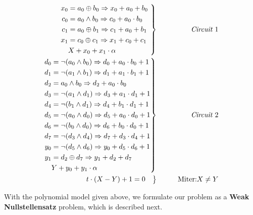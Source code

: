 \begin{Example}
\begin{eqnarray}%
 \left .  \begin{aligned}
	x_0&=a_0 \oplus b_0  \Rightarrow x_0+a_0 + b_0 \\
	c_0&=a_0\wedge b_0   \Rightarrow c_0+a_0 \cdot b_0\\
	c_1&=a_0\oplus b_1   \Rightarrow c_1+a_0 + b_1 \\
	x_{1}&=c_{0}\oplus c_{1}  \Rightarrow x_{1}+c_{0}+ c_{1} \\
	&X+x_{0}+x_{1}\cdot \alpha				\\
	 \end{aligned} 
\ \right\}
 &\qquad&  \text{\it Circuit $1$} \nonumber \\
 \left . \begin{aligned}
d_{0}&=\neg (a_{0} \wedge b_{0}) \Rightarrow d_{0}+ a_{0} \cdot b_{0}+1  \\
	d_{1}&=\neg (a_{1} \wedge b_{1}) \Rightarrow d_{1}+ a_{1} \cdot b_{1}+1  \\
	d_{2}&= a_{0} \wedge b_{0} \Rightarrow d_{2}+ a_{0}\cdot b_{0} \\
	d_{3}&=\neg (a_{1} \wedge d_{1}) \Rightarrow d_{3}+ a_{1} \cdot d_{1}+1  \\
	d_{4}&=\neg (b_{1} \wedge d_{1}) \Rightarrow d_{4}+ b_{1} \cdot d_{1}+1  \\
	d_{5}&=\neg (a_{0} \wedge d_{0}) \Rightarrow d_{5}+ a_{0} \cdot d_{0}+1  \\
	d_{6}&=\neg (b_{0} \wedge d_{0}) \Rightarrow d_{6}+ b_{0} \cdot d_{0}+1  \\
	d_{7}&=\neg (d_{3} \wedge d_{4}) \Rightarrow d_{7}+ d_{3} \cdot d_{4}+1  \\ 
	y_{0}&=\neg (d_{5} \wedge d_{6}) \Rightarrow y_{0}+ d_{5} \cdot d_{6}+1  \\
	y_{1}&=d_{2} \oplus d_{7}   \Rightarrow  y_{1}+d_{2} + d_{7}	\\
	&Y+y_{0}+y_{1}\cdot \alpha				\\
 \end{aligned} 
\right\}
 &\qquad&  \text{\it  Circuit $2$} \nonumber \\
 \left .  \begin{aligned}
	&t\cdot (X-Y)+1=0 				
 \end{aligned} 
\right\}
 &\qquad& \text{Miter:}X \neq Y
\end{eqnarray}

\end{Example}


With the polynomial model given above, we formulate our problem as a {\bf Weak Nullstellensatz} problem, 
which is described next.

